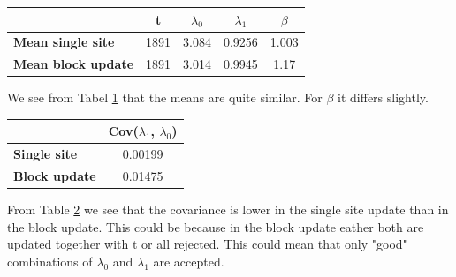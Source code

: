 \begin{table}[]
\begin{tabular}{lcccc}
                           & \textbf{t} & \textbf{$\lambda_0$} & \textbf{$\lambda_1$} & \textbf{$\beta$} \\ \hline
\textbf{Mean single site}  & 1891       & 3.084              & 0.9256             & 1.003         \\
\textbf{Mean block update} & 1891       & 3.014              & 0.9945             & 1.17         
\end{tabular}
\label{tab:mean}
\end{table}

We see from Tabel \ref{tab:mean} that the means are quite similar. For $\beta$ it differs slightly. 

\begin{table}[]
\begin{tabular}{lc}
                      & \textbf{Cov($\lambda_1$, $\lambda_0$)} \\ \hline
\textbf{Single site}  & 0.00199                            \\
\textbf{Block update} & 0.01475                           
\end{tabular}
\label{tab:cov}
\end{table}

From Table \ref{tab:cov} we see that the covariance is lower in the single site update than in the block update. This could be because in the block update eather both are updated together with t or all rejected. This could mean that only "good" combinations of $\lambda_0$ and $\lambda_1$ are accepted. 